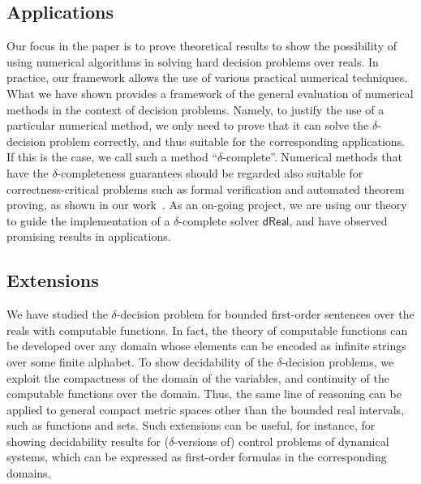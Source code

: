 \documentclass[conference]{IEEEtran}
\begin{document}

\subsection{Applications} 

Our focus in the paper is to prove theoretical results to show the possibility of using numerical algorithms in solving hard decision problems over reals. In practice, our framework allows the use of various practical numerical techniques. What we have shown provides a framework of the general evaluation of numerical methods in the context of decision problems. Namely, to justify the use of a particular numerical method, we only need to prove that it can solve the $\delta$-decision problem correctly, and thus suitable for the corresponding applications. If this is the case, we call such a method ``$\delta$-complete''. Numerical methods that have the $\delta$-completeness guarantees should be regarded also suitable for correctness-critical problems such as formal verification and automated theorem proving, as shown in our work~\cite{ijcar12,DBLP:conf/fmcad/Gao10}. As an on-going project, we are using our theory to guide the implementation of a $\delta$-complete solver $\mathsf{dReal}$, and have observed promising results in applications. 

\subsection{Extensions}

We have studied the $\delta$-decision problem for bounded first-order sentences over the reals with computable functions. In fact, the theory of computable functions can be developed over any domain whose elements can be encoded as infinite strings over some finite alphabet. To show decidability of the $\delta$-decision problems, we exploit the compactness of the domain of the variables, and continuity of the computable functions over the domain. Thus, the same line of reasoning can be applied to general compact metric spaces other than the bounded real intervals, such as functions and sets. Such extensions can be useful, for instance, for showing decidability results for ($\delta$-versions of) control problems of dynamical systems, which can be expressed as first-order formulas in the corresponding domains. 
\end{document}
